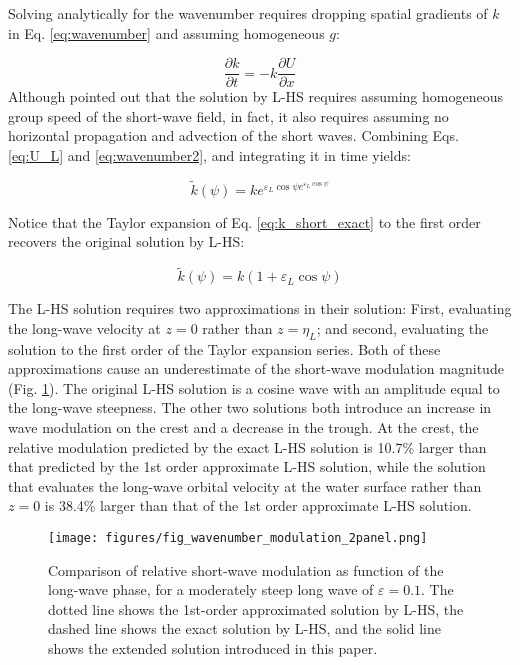 \documentclass[draft]{agujournal2019}
\begin{document}
Solving analytically for the wavenumber requires dropping spatial gradients of
$k$ in Eq. \ref{eq:wavenumber} and assuming homogeneous $g$:

\begin{equation}
\label{eq:wavenumber2}
\dfrac{\partial k}{\partial t}
= - k \dfrac{\partial U}{\partial x}
\end{equation}
Although  pointed out that the solution by L-HS
requires assuming homogeneous group speed of the short-wave field, in fact,
it also requires assuming no horizontal propagation and advection of the short
waves.
Combining Eqs. \ref{eq:U_L} and \ref{eq:wavenumber2}, and integrating it in time
yields:

\begin{equation}
\label{eq:k_short_exact}
\widetilde{k}(\psi) = k e^{\varepsilon_L \cos{\psi} e^{\varepsilon_L \cos{\psi}}}
\end{equation}

Notice that the Taylor expansion of Eq. \ref{eq:k_short_exact} to the first order
recovers the original solution by L-HS:

\begin{equation}
\label{eq:k_short_lhs}
\widetilde{k}(\psi) = k (1 + \varepsilon_L \cos{\psi})
\end{equation}

The L-HS solution requires two approximations in their solution:
First, evaluating the long-wave velocity at $z = 0$
rather than $z = \eta_L$; and second, evaluating the solution to the first order
of the Taylor expansion series.
Both of these approximations cause an underestimate of the short-wave
modulation magnitude (Fig. \ref{fig:wavenumber_modulation}).
The original L-HS solution is a cosine wave with an amplitude equal
to the long-wave steepness.
The other two solutions both introduce an increase in wave modulation
on the crest and a decrease in the trough.
At the crest, the relative modulation predicted by the exact L-HS solution
is 10.7\% larger than that predicted by the 1st order approximate L-HS
solution, while the solution that evaluates the long-wave orbital velocity
at the water surface rather than $z = 0$ is 38.4\% larger than that of the
1st order approximate L-HS solution.

\begin{figure}[h]
\label{fig:wavenumber_modulation}
\centering
\texttt{[image: figures/fig\_wavenumber\_modulation\_2panel.png]}
\caption{
  Comparison of relative short-wave modulation as function of the
  long-wave phase, for a moderately steep long wave of $\varepsilon = 0.1$.
  The dotted line shows the 1st-order approximated solution by L-HS,
  the dashed line shows the exact solution by L-HS,
  and the solid line shows the extended solution introduced in this paper.
}
\end{figure}
\end{document}
